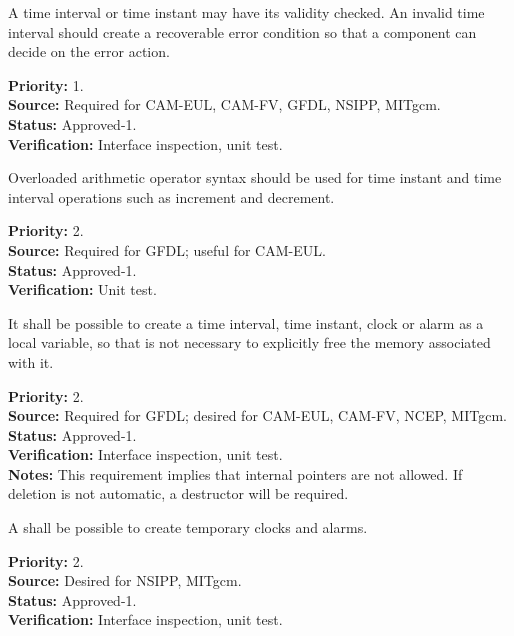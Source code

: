 A time interval or time instant may have its validity checked.  An invalid time 
interval should create a recoverable error condition so that a component can decide 
on the error action.
\begin{reqlist}
{\bf Priority:} 1. \\
{\bf Source:} Required for CAM-EUL, CAM-FV, GFDL, NSIPP, MITgcm.\\
{\bf Status:} Approved-1. \\
{\bf Verification:} Interface inspection, unit test. 
\end{reqlist}

Overloaded arithmetic operator syntax should be used for time instant and
time interval operations such as increment and decrement.
\begin{reqlist}
{\bf Priority:} 2. \\
{\bf Source:} Required for GFDL; useful for CAM-EUL. \\
{\bf Status:} Approved-1. \\
{\bf Verification:} Unit test. 
\end{reqlist}

It shall be possible to create a time interval, time instant, clock or 
alarm as a local variable, so that is not necessary to explicitly free the memory 
associated with it. 
\begin{reqlist}
{\bf Priority:} 2. \\
{\bf Source:} Required for GFDL; desired for CAM-EUL, CAM-FV, NCEP, MITgcm. \\
{\bf Status:} Approved-1. \\
{\bf Verification:} Interface inspection, unit test. \\ 
{\bf Notes:} This requirement implies that internal pointers are not allowed.  
If deletion is not automatic, a destructor will be required. 
\end{reqlist}

A shall be possible to create temporary clocks and alarms.
\begin{reqlist}
{\bf Priority:} 2. \\
{\bf Source:} Desired for NSIPP, MITgcm. \\
{\bf Status:} Approved-1. \\
{\bf Verification:} Interface inspection, unit test. \\
\end{reqlist}

